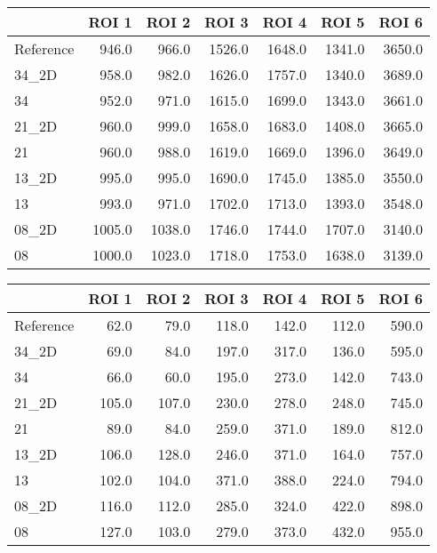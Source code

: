 \begin{tabular}{lrrrrrr}
\toprule
{} &   ROI 1 &   ROI 2 &   ROI 3 &   ROI 4 &   ROI 5 &   ROI 6 \\
\midrule
Reference &   946.0 &   966.0 &  1526.0 &  1648.0 &  1341.0 &  3650.0 \\
34\_2D     &   958.0 &   982.0 &  1626.0 &  1757.0 &  1340.0 &  3689.0 \\
34        &   952.0 &   971.0 &  1615.0 &  1699.0 &  1343.0 &  3661.0 \\
21\_2D     &   960.0 &   999.0 &  1658.0 &  1683.0 &  1408.0 &  3665.0 \\
21        &   960.0 &   988.0 &  1619.0 &  1669.0 &  1396.0 &  3649.0 \\
13\_2D     &   995.0 &   995.0 &  1690.0 &  1745.0 &  1385.0 &  3550.0 \\
13        &   993.0 &   971.0 &  1702.0 &  1713.0 &  1393.0 &  3548.0 \\
08\_2D     &  1005.0 &  1038.0 &  1746.0 &  1744.0 &  1707.0 &  3140.0 \\
08        &  1000.0 &  1023.0 &  1718.0 &  1753.0 &  1638.0 &  3139.0 \\
\bottomrule
\end{tabular}
\begin{tabular}{lrrrrrr}
\toprule
{} &  ROI 1 &  ROI 2 &  ROI 3 &  ROI 4 &  ROI 5 &  ROI 6 \\
\midrule
Reference &   62.0 &   79.0 &  118.0 &  142.0 &  112.0 &  590.0 \\
34\_2D     &   69.0 &   84.0 &  197.0 &  317.0 &  136.0 &  595.0 \\
34        &   66.0 &   60.0 &  195.0 &  273.0 &  142.0 &  743.0 \\
21\_2D     &  105.0 &  107.0 &  230.0 &  278.0 &  248.0 &  745.0 \\
21        &   89.0 &   84.0 &  259.0 &  371.0 &  189.0 &  812.0 \\
13\_2D     &  106.0 &  128.0 &  246.0 &  371.0 &  164.0 &  757.0 \\
13        &  102.0 &  104.0 &  371.0 &  388.0 &  224.0 &  794.0 \\
08\_2D     &  116.0 &  112.0 &  285.0 &  324.0 &  422.0 &  898.0 \\
08        &  127.0 &  103.0 &  279.0 &  373.0 &  432.0 &  955.0 \\
\bottomrule
\end{tabular}
